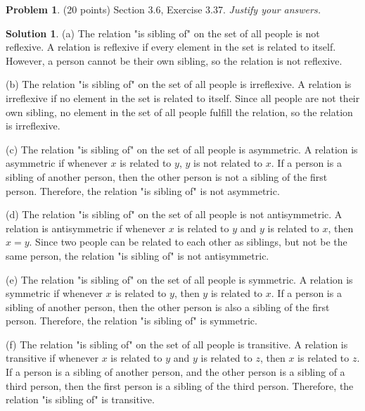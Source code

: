 \documentclass{article}
\theoremstyle{definition}
\newtheorem{problem}{Problem}
\newtheorem*{solution}{Solution}
\begin{document}
\newpage
\begin{problem} (20 points) Section 3.6, Exercise 3.37. \textit{Justify your answers.}
\end{problem}
\begin{solution} 
(a) The relation "is sibling of" on the set of all people is not reflexive.
A relation is reflexive if every element in the set is related to itself.
However, a person cannot be their own sibling, so the relation is not reflexive.

(b) The relation "is sibling of" on the set of all people is irreflexive.
A relation is irreflexive if no element in the set is related to itself.
Since all people are not their own sibling, no element in the set of all people fulfill the relation, so the relation is irreflexive.

(c) The relation "is sibling of" on the set of all people is asymmetric.
A relation is asymmetric if whenever $x$ is related to $y$, $y$ is not related to $x$.
If a person is a sibling of another person, then the other person is not a sibling of the first person.
Therefore, the relation "is sibling of" is not asymmetric.

(d) The relation "is sibling of" on the set of all people is not antisymmetric.
A relation is antisymmetric if whenever $x$ is related to $y$ and $y$ is related to $x$, then $x = y$.
Since two people can be related to each other as siblings, but not be the same person, the relation "is sibling of" is not antisymmetric.

(e) The relation "is sibling of" on the set of all people is symmetric.
A relation is symmetric if whenever $x$ is related to $y$, then $y$ is related to $x$.
If a person is a sibling of another person, then the other person is also a sibling of the first person.
Therefore, the relation "is sibling of" is symmetric.

(f) The relation "is sibling of" on the set of all people is transitive.
A relation is transitive if whenever $x$ is related to $y$ and $y$ is related to $z$, then $x$ is related to $z$.
If a person is a sibling of another person, and the other person is a sibling of a third person, then the first person is a sibling of the third person.
Therefore, the relation "is sibling of" is transitive.
\end{solution}
\end{document}

